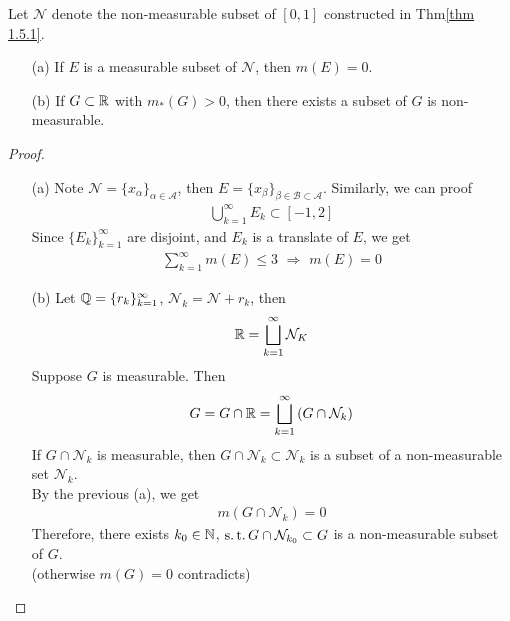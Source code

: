	\begin{proposition}\label{prop 1.5.1}
		Let $\mathcal{N}$ denote the non-measurable subset of $[0 , 1]$ constructed in Thm\ref{thm 1.5.1}.
		\begin{enumerate}
			\item[(a)]If $E$ is a measurable subset of $\mathcal{N}$, then $m(E) = 0$.
			
			\item[(b)]If $G \subset \mathbb{R}$ with $m_{*}(G) > 0$, then there exists a subset of $G$ is non-measurable.
		\end{enumerate}
	
		\vspace{2em}
		\begin{proof}
			\begin{enumerate}
				\item[(a)]Note $\mathcal{N} = \{ x_\alpha \}_{\alpha \in \mathcal{A}}$, then $E = \{ x_\beta \}_{\beta \in \mathcal{B} \subset \mathcal{A}}$. Similarly, we can proof
				\begin{align}
					\bigcup_{k = 1}^{\infty}{E_k} \subset [-1 , 2]
				\end{align}
				Since $\{ E_k \}_{k = 1}^{\infty}$ are disjoint, and $E_k$ is a translate of $E$, we get
				\begin{align}
					\sum_{k = 1}^{\infty}{m(E)} \leq 3 \,\, \Rightarrow \,\, m(E) = 0
				\end{align}
			
				\item[(b)]Let $\mathbb{Q} = \{ r_k \}_{k = 1}^{\infty}$, $\mathcal{N}_k = \mathcal{N} + r_k$, then
				\begin{align}
					\mathbb{R} = \bigsqcup_{k = 1}^{\infty}{\mathcal{N}_K}
				\end{align}
				Suppose $G$ is measurable. Then
				\begin{align}
					G = G \cap \mathbb{R} = \bigsqcup_{k = 1}^{\infty}{(G \cap \mathcal{N}_k)}
				\end{align}
				If $G \cap \mathcal{N}_k$ is measurable, then $G \cap \mathcal{N}_k \subset \mathcal{N}_k$ is a subset of a non-measurable set $\mathcal{N}_k$.\\
				By the previous (a), we get
				\begin{align}
					m(G \cap \mathcal{N}_k) = 0
				\end{align}
				Therefore, there exists $k_0 \in \mathbb{N}$, $\operatorname{s.t.} G \cap \mathcal{N}_{k_0} \subset G$ is a non-measurable subset of $G$.\\
				(otherwise $m(G) = 0$ contradicts)
			\end{enumerate}
		\end{proof}
	\end{proposition}
 	



	\ifx\allfiles\undefined

\fi
